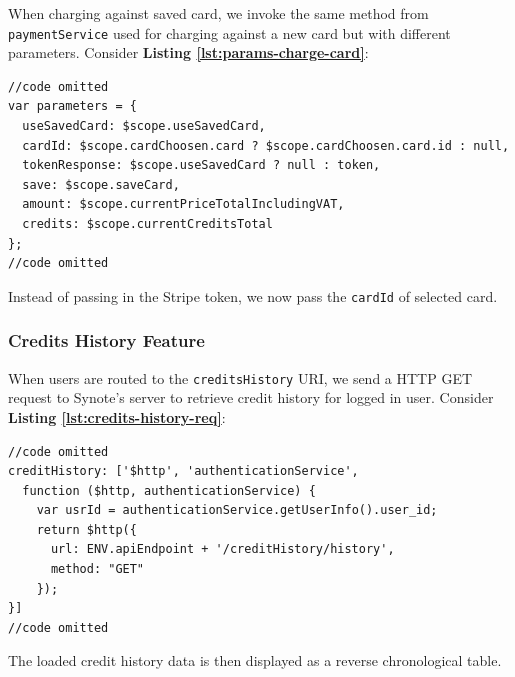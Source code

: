 When charging against saved card, we invoke the same method from \texttt{paymentService} used for charging against a new card but with different parameters. Consider \textbf{Listing \ref{lst:params-charge-card}}:\\

\begin{listing}[H]
\begin{verbatim}
//code omitted
var parameters = {
  useSavedCard: $scope.useSavedCard,
  cardId: $scope.cardChoosen.card ? $scope.cardChoosen.card.id : null,
  tokenResponse: $scope.useSavedCard ? null : token,
  save: $scope.saveCard,
  amount: $scope.currentPriceTotalIncludingVAT,
  credits: $scope.currentCreditsTotal
};
//code omitted
\end{verbatim}
\label{lst:params-charge-card}
\end{listing}

Instead of passing in the Stripe token, we now pass the \texttt{cardId} of selected card.

\subsubsection{Credits History Feature}
\label{subsubsec:credits-history-feature}

When users are routed to the \texttt{creditsHistory} URI, we send a HTTP GET request to Synote’s server to retrieve credit history for logged in user. Consider \textbf{Listing \ref{lst:credits-history-req}}:\\

\begin{listing}[H]
\begin{verbatim}
//code omitted
creditHistory: ['$http', 'authenticationService',
  function ($http, authenticationService) {
    var usrId = authenticationService.getUserInfo().user_id;
    return $http({
      url: ENV.apiEndpoint + '/creditHistory/history',
      method: "GET"
    });
}]
//code omitted
\end{verbatim}
\label{lst:credits-history-req}
\end{listing}

The loaded credit history data is then displayed as a reverse chronological table.

